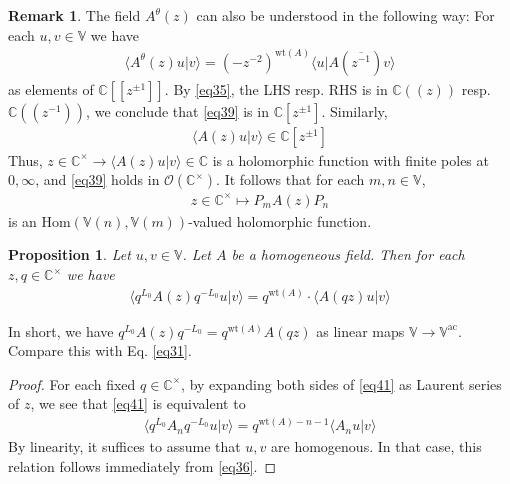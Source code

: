 \documentclass[12pt,b5paper,notitlepage]{article}
\theoremstyle{definition}
\newtheorem{rem}[df]{Remark}
\theoremstyle{plain}
\newtheorem{pp}[df]{Proposition}
\newcommand{\ovl}{\overline}
\newcommand{\Hom}{\mathrm{Hom}}
\newcommand{\bk}[1]{\langle {#1}\rangle}
\newcommand{\scr}{\mathscr}
\newcommand{\Vbb}{\mathbb V}
\newcommand{\Cbb}{\mathbb C}
\newcommand{\wt}{\mathrm{wt}}
\newcommand{\ac}{\mathrm{ac}}
\numberwithin{equation}{section}
\begin{document}
\begin{rem}\label{lb16}
The field $A^\theta(z)$ can also be understood in the following way: For each $u,v\in\Vbb$ we have
\begin{align}\label{eq39}
\bk{A^\theta(z)u|v}=(-z^{-2})^{\wt(A)}\bk{u|A(\ovl{z^{-1}})v}
\end{align}
as elements of $\Cbb[[z^{\pm1}]]$. By \eqref{eq35}, the LHS resp. RHS is in $\Cbb((z))$ resp. $\Cbb((z^{-1}))$, we conclude that \eqref{eq39} is in $\Cbb[z^{\pm1}]$. Similarly,
\begin{align*}
\bk{A(z)u|v}\in\Cbb[z^{\pm1}]
\end{align*}
Thus, $z\in\Cbb^\times\rightarrow\bk{A(z)u|v}\in\Cbb$ is a holomorphic function with finite poles at $0,\infty$, and \eqref{eq39} holds in $\scr O(\Cbb^\times)$. It follows that for each $m,n\in\Vbb$, 
\begin{align*}
z\in\Cbb^\times\mapsto P_m A(z)P_n
\end{align*}
is an $\Hom(\Vbb(n),\Vbb(m))$-valued holomorphic function.
\end{rem}



\begin{pp}\label{lb18}
Let $u,v\in\Vbb$. Let $A$ be a homogeneous field. Then for each $z,q\in\Cbb^\times$ we have
\begin{align}\label{eq41}
\bk{q^{L_0}A(z)q^{-L_0}u|v}=q^{\wt(A)}\cdot\bk{A(qz)u|v}
\end{align}
\end{pp}

In short, we have $q^{L_0}A(z)q^{-L_0}=q^{\wt(A)}A(qz)$ as linear maps $\Vbb\rightarrow\Vbb^\ac$. Compare this with Eq. \eqref{eq31}.

\begin{proof}
For each fixed $q\in\Cbb^\times$, by expanding both sides of \eqref{eq41} as Laurent series of $z$, we see that \eqref{eq41} is equivalent to
\begin{align}
\bk{q^{L_0}A_nq^{-L_0}u|v}=q^{\wt(A)-n-1}\bk{A_nu|v}
\end{align}
By linearity, it suffices to assume that $u,v$ are homogenous. In that case, this relation follows immediately from \eqref{eq36}.
\end{proof}




\subsection{}
\end{document}
